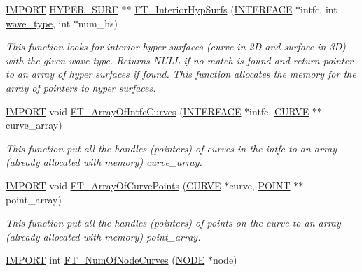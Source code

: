 \begin{DoxyCompactItemize}
\hyperlink{cdecs_8h_a773175d74e73776d69c3e538f17de1ee}{I\+M\+P\+O\+RT} \hyperlink{int_8h_acef50fa4757ce0d3f75c97fab5a175bc}{H\+Y\+P\+E\+R\+\_\+\+S\+U\+RF} $\ast$$\ast$ \hyperlink{group___q_u_e_r_y_ga284615aa684afaf4edc86afab5d0ac3d}{F\+T\+\_\+\+Interior\+Hyp\+Surfs} (\hyperlink{int_8h_a58cf562d0d320a608294b7310ea167dc}{I\+N\+T\+E\+R\+F\+A\+CE} $\ast$intfc, int \hyperlink{fuserint_8h_aff856283a1093533d99780203d6d3e65}{wave\+\_\+type}, int $\ast$num\+\_\+hs)
\begin{DoxyCompactList}\small\item\em This function looks for interior hyper surfaces (curve in 2D and surface in 3D) with the given wave type. Returns N\+U\+LL if no match is found and return pointer to an array of hyper surfaces if found. This function allocates the memory for the array of pointers to hyper surfaces. \end{DoxyCompactList}\item 
\hyperlink{cdecs_8h_a773175d74e73776d69c3e538f17de1ee}{I\+M\+P\+O\+RT} void \hyperlink{group___q_u_e_r_y_ga4f56672571ef59cb0be35967c460be8e}{F\+T\+\_\+\+Array\+Of\+Intfc\+Curves} (\hyperlink{int_8h_a58cf562d0d320a608294b7310ea167dc}{I\+N\+T\+E\+R\+F\+A\+CE} $\ast$intfc, \hyperlink{int_8h_a4c1c272bef898dbaa20b055af85cd685}{C\+U\+R\+VE} $\ast$$\ast$curve\+\_\+array)
\begin{DoxyCompactList}\small\item\em This function put all the handles (pointers) of curves in the intfc to an array (already allocated with memory) curve\+\_\+array. \end{DoxyCompactList}\item 
\hyperlink{cdecs_8h_a773175d74e73776d69c3e538f17de1ee}{I\+M\+P\+O\+RT} void \hyperlink{group___q_u_e_r_y_ga2039349c92878e260d0d3232d0c24203}{F\+T\+\_\+\+Array\+Of\+Curve\+Points} (\hyperlink{int_8h_a4c1c272bef898dbaa20b055af85cd685}{C\+U\+R\+VE} $\ast$curve, \hyperlink{int_8h_a3a87c5c9d0146e30a4bf720f701e5a63}{P\+O\+I\+NT} $\ast$$\ast$point\+\_\+array)
\begin{DoxyCompactList}\small\item\em This function put all the handles (pointers) of points on the curve to an array (already allocated with memory) point\+\_\+array. \end{DoxyCompactList}\item 
\hyperlink{cdecs_8h_a773175d74e73776d69c3e538f17de1ee}{I\+M\+P\+O\+RT} int \hyperlink{group___q_u_e_r_y_ga6ee0e1dbcfc9a442dbb0e1fee99b4fae}{F\+T\+\_\+\+Num\+Of\+Node\+Curves} (\hyperlink{int_8h_a65acc517559b106aa8e5fe339247ddcd}{N\+O\+DE} $\ast$node)
$$
\end{DoxyCompactItemize}
